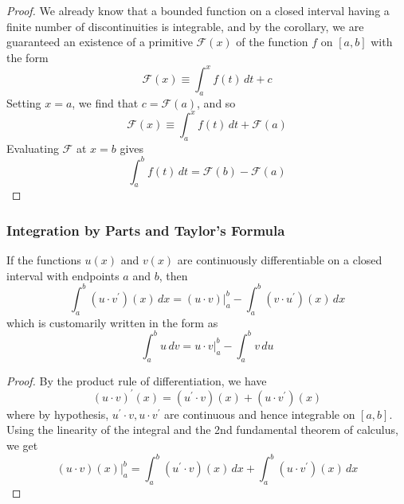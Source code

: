     \begin{proof}
      We already know that a bounded function on a closed interval having a finite number of discontinuities is integrable, and by the corollary, we are guaranteed an existence of a primitive $\mathcal{F}(x)$ of the function $f$ on $[a, b]$ with the form 
      \[\mathcal{F} (x) \equiv \int_a^x f(t)\,dt + c\]
      Setting $x = a$, we find that $c = \mathcal{F}(a)$, and so 
      \[\mathcal{F}(x) \equiv \int_a^x f(t)\,dt + \mathcal{F}(a)\]
      Evaluating $\mathcal{F}$ at $x = b$ gives
      \[\int_a^b f(t)\,dt = \mathcal{F}(b) - \mathcal{F}(a)\]
    \end{proof}

    \subsubsection{Integration by Parts and Taylor's Formula}
    \begin{theorem}
    If the functions $u(x)$ and $v(x)$ are continuously differentiable on a closed interval with endpoints $a$ and $b$, then
    \[\int_a^b (u \cdot v^\prime)(x)\,dx = (u \cdot v)\big|^b_a - \int_a^b (v \cdot u^\prime)(x)\,dx\]
    which is customarily written in the form as
    \[\int_a^b u\,dv = u \cdot v \big|_a^b - \int_a^b v\,du\]
    \end{theorem}
    \begin{proof}
    By the product rule of differentiation, we have
    \[(u \cdot v)^\prime (x) = (u^\prime \cdot v)(x) + (u \cdot v^\prime) (x)\]
    where by hypothesis, $u^\prime \cdot v, u \cdot v^\prime$ are continuous and hence integrable on $[a, b]$. Using the linearity of the integral and the 2nd fundamental theorem of calculus, we get
    \[(u \cdot v) (x) \big|^b_a = \int_a^b (u^\prime \cdot v)(x)\,dx + \int_a^b (u \cdot v^\prime) (x)\,dx\]
    \end{proof}

